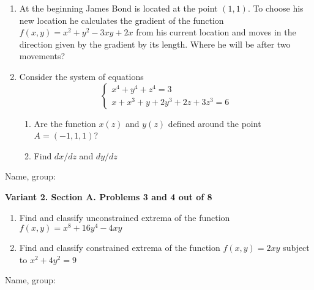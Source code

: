 \documentclass[12pt,a4paper]{article}
\begin{document}
\begin{enumerate}

\item At the beginning James Bond is located at the point $(1, 1)$. To choose his new location he calculates the gradient of the function $f(x,y)=x^2+y^2 - 3xy+2x$ from his current location and moves in the direction given by the gradient by its length. Where he will be after two movements?

\item Consider the system of equations
\[
\begin{cases}
x^4 + y^4 + z^4 = 3 \\
x + x^3 + y + 2y^3 + 2z + 3z^3 = 6
\end{cases}
\]

\begin{enumerate}
\item Are the function $x(z)$ and $y(z)$ defined around the point $A=(-1,1,1)$?
\item Find $dx/dz$ and $dy/dz$
\end{enumerate}

\end{enumerate}

\begin{framed}
\begin{minipage}{42em}
Name, group:\vspace*{3ex}\par 
\noindent\dotfill
\end{minipage}
\end{framed}


\newpage
\textbf{Variant 2. Section A. Problems 3 and 4 out of 8}


\begin{enumerate}[resume]


\item Find and classify unconstrained extrema of the function $f(x,y)=x^8 + 16y^4 - 4xy$

\item Find and classify constrained extrema of the function $f(x, y) =  2xy$ subject to $x^2 + 4y^2= 9$

\end{enumerate}

\begin{framed}
\begin{minipage}{42em}
Name, group:\vspace*{3ex}\par 
\noindent\dotfill
\end{minipage}
\end{framed}
\end{document}
